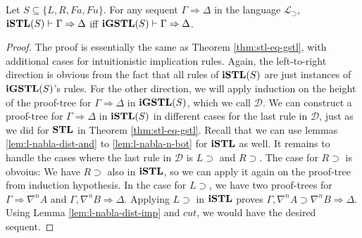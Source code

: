 \begin{thm}\label{thm:istl-eq-igstl}
	Let $S \subseteq \{L, R, Fa, Fu\}$. For any sequent $\Gamma \Rightarrow \Delta$ in the language $\mathcal{L}_\supset$, $\mathbf{iSTL}(S) \vdash \Gamma \Rightarrow \Delta$ iff $\mathbf{iGSTL}(S) \vdash \Gamma \Rightarrow \Delta$.
\end{thm}
\begin{proof}
	The proof is essentially the same as Theorem \ref{thm:stl-eq-gstl}, with additional cases for intuitionistic implication rules. Again, the left-to-right direction is obvious from the fact that all rules of $\mathbf{iSTL}(S)$ are just instances of $\mathbf{iGSTL}(S)$'s rules. For the other direction, we will apply induction on the height of the proof-tree for $\Gamma \Rightarrow \Delta$ in $\mathbf{iGSTL}(S)$, which we call $\mathcal{D}$. We can construct a proof-tree for $\Gamma \Rightarrow \Delta$ in $\mathbf{iSTL}(S)$ in different cases for the last rule in $\mathcal{D}$, just as we did for $\mathbf{STL}$ in Theorem \ref{thm:stl-eq-gstl}. Recall that we can use lemmas \ref{lem:l-nabla-dist-and} to \ref{lem:l-nabla-n-bot} for $\mathbf{iSTL}$ as well.
	It remains to handle the cases where the last rule in $\mathcal{D}$ is $L \supset$ and $R \supset$. The case for $R \supset$ is obvoius: We have $R \supset$ also in $\mathbf{iSTL}$, so we can apply it again on the proof-tree from induction hypothesis. In the case for $L \supset$, we have two proof-trees for $\Gamma \Rightarrow \nabla^n A$ and $\Gamma, \nabla^n B \Rightarrow \Delta$. Applying $L \supset$ in $\mathbf{iSTL}$ proves $\Gamma, \nabla^n A \supset \nabla^n B \Rightarrow \Delta$. Using Lemma \ref{lem:l-nabla-dist-imp} and $cut$, we would have the desired sequent.
\end{proof}